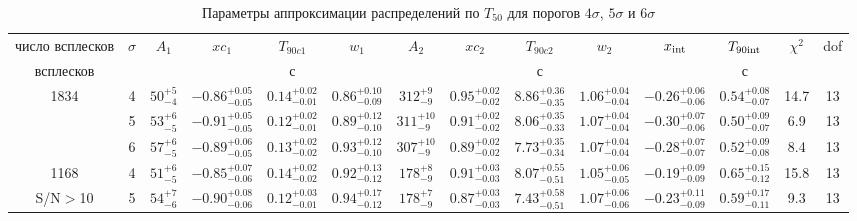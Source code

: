 \begin{table} [h]
 \centering
 \caption{Параметры аппроксимации распределений по $T_{50}$ для порогов 
          $4\sigma$, $5\sigma$ и $6\sigma$}\label{tab:T50_distr}
\scriptsize
  \begin{center}
  \begin{tabular}{c c c c c c c c c c c c c c}
  \hline
  \hline
число всплесков & $\sigma$ & $A_1$ & $xc_1$ & $T_{90c1}$ & $w_1$ & 
                             $A_2$ & $xc_2$ & $T_{90c2}$ & $w_2$ & 
							 $x_{{\mathrm{int}}}$ & $T_{90{\mathrm{int}}}$ & $\chi^2$ & dof \\
							 
всплесков & & & & с & & & & с & & &  с & & \\
\hline
1834 & 4 & $     50 ^{+     5}_{-     4}$ & $  -0.86 ^{+  0.05}_{-  0.05}$ & $   0.14 ^{+  0.02}_{-  0.01}$ & $   0.86 ^{+  0.10}_{-  0.09}$ & $    312 ^{+     9}_{-     9}$ & $   0.95 ^{+  0.02}_{-  0.02}$ & $   8.86 ^{+  0.36}_{-  0.35}$ & $   1.06 ^{+  0.04}_{-  0.04}$ & $  -0.26 ^{+  0.06}_{-  0.06}$ & $  0.54 ^{+ 0.08}_{- 0.07}$ &   14.7 & 13 \\ 
& 5 & $     53 ^{+     6}_{-     5}$ & $  -0.91 ^{+  0.05}_{-  0.05}$ & $   0.12 ^{+  0.02}_{-  0.01}$ & $   0.89 ^{+  0.12}_{-  0.10}$ & $    311 ^{+    10}_{-     9}$ & $   0.91 ^{+  0.02}_{-  0.02}$ & $   8.06 ^{+  0.35}_{-  0.33}$ & $   1.07 ^{+  0.04}_{-  0.04}$ & $  -0.30 ^{+  0.07}_{-  0.06}$ & $  0.50 ^{+ 0.09}_{- 0.07}$ &    6.9 & 13 \\ 
& 6 & $     57 ^{+     6}_{-     5}$ & $  -0.89 ^{+  0.06}_{-  0.05}$ & $   0.13 ^{+  0.02}_{-  0.02}$ & $   0.93 ^{+  0.12}_{-  0.10}$ & $    307 ^{+    10}_{-     9}$ & $   0.89 ^{+  0.02}_{-  0.02}$ & $   7.73 ^{+  0.35}_{-  0.34}$ & $   1.07 ^{+  0.04}_{-  0.04}$ & $  -0.28 ^{+  0.07}_{-  0.07}$ & $  0.52 ^{+ 0.09}_{- 0.08}$ &    8.4 & 13 \\ 
1168 &4 & $     51 ^{+     6}_{-     5}$ & $  -0.85 ^{+  0.07}_{-  0.06}$ & $   0.14 ^{+  0.02}_{-  0.02}$ & $   0.92 ^{+  0.13}_{-  0.12}$ & $    178 ^{+     8}_{-     9}$ & $   0.91 ^{+  0.03}_{-  0.03}$ & $   8.07 ^{+  0.55}_{-  0.51}$ & $   1.05 ^{+  0.06}_{-  0.05}$ & $  -0.19 ^{+  0.09}_{-  0.09}$ & $  0.65 ^{+ 0.15}_{- 0.12}$ &   15.8 & 13 \\ 
S/N$>$10 &  5 & $     54 ^{+     7}_{-     6}$ & $  -0.90 ^{+  0.08}_{-  0.06}$ & $   0.12 ^{+  0.03}_{-  0.01}$ & $   0.94 ^{+  0.17}_{-  0.12}$ & $    178 ^{+     7}_{-     9}$ & $   0.87 ^{+  0.03}_{-  0.03}$ & $   7.43 ^{+  0.58}_{-  0.51}$ & $   1.07 ^{+  0.06}_{-  0.06}$ & $  -0.23 ^{+  0.11}_{-  0.09}$ & $  0.59 ^{+ 0.17}_{- 0.11}$ &    9.3 & 13 \\ 

\end{tabular}
\end{center}
\end{table}
